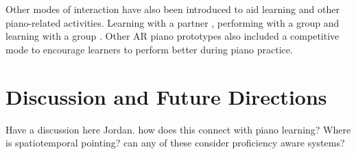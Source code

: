 \documentclass[sigchi, review]{acmart}
\begin{document}
Other modes of interaction have also been introduced to aid learning and other piano-related activities. Learning with a partner \cite{xiao2011duet}, performing with a group \cite{gerry2019adept} and learning with a group \cite{cai2019design}. Other AR piano prototypes also included a competitive mode \cite{cai2019designb} to encourage learners to perform better during piano practice. 

\section{Discussion and Future Directions}
Have a discussion here Jordan. how does this connect with piano learning? 
Where is spatiotemporal pointing?
can any of these consider proficiency aware systems? 
\label{sec: discuss}





\balance


\end{document}
